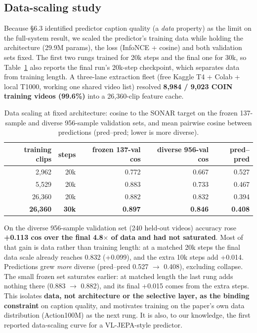 \subsection{Data-scaling study}

Because \S6.3 identified predictor caption quality (a \emph{data} property) as the limit on the full-system result, we scaled the predictor's training data while holding the architecture (29.9M params), the loss (InfoNCE + cosine) and both validation sets fixed. The first two rungs trained for 20k steps and the final one for 30k, so Table~\ref{tab:scaling} also reports the final run's 20k-step checkpoint, which separates data from training length. A three-lane extraction fleet (free Kaggle T4 + Colab + local T1000, working one shared video list) resolved \textbf{8,984 / 9,023 COIN training videos (99.6\%)} into a 26,360-clip feature cache.

\begin{table}[htbp]
\centering\small
\caption{Data scaling at fixed architecture: cosine to the SONAR target on the frozen 137-sample and diverse 956-sample validation sets, and mean pairwise cosine between predictions (pred--pred; lower is more diverse).}
\label{tab:scaling}
\begin{tabular}{rrrrr}
\toprule
\textbf{training clips} & \textbf{steps} & \textbf{frozen 137-val cos} & \textbf{diverse 956-val cos} & \textbf{pred--pred} \\
\midrule
2,962 & 20k & 0.772 & 0.667 & 0.527 \\
5,529 & 20k & 0.883 & 0.733 & 0.467 \\
26,360 & 20k & 0.882 & 0.832 & 0.394 \\
\textbf{26,360} & \textbf{30k} & \textbf{0.897} & \textbf{0.846} & \textbf{0.408} \\
\bottomrule
\end{tabular}
\end{table}

On the diverse 956-sample validation set (240 held-out videos) accuracy rose \textbf{+0.113 cos over the final 4.8$\times$ of data and had not saturated}. Most of that gain is data rather than training length: at a matched 20k steps the final data scale already reaches 0.832 (+0.099), and the extra 10k steps add +0.014. Predictions grew \emph{more} diverse (pred--pred 0.527 $\rightarrow$ 0.408), excluding collapse. The small frozen set saturates earlier: at matched length the last rung adds nothing there (0.883 $\rightarrow$ 0.882), and its final +0.015 comes from the extra steps. This isolates \textbf{data, not architecture or the selective layer, as the binding constraint} on caption quality, and motivates training on the paper's own data distribution (Action100M) as the next rung. It is also, to our knowledge, the first reported data-scaling curve for a VL-JEPA-style predictor.

